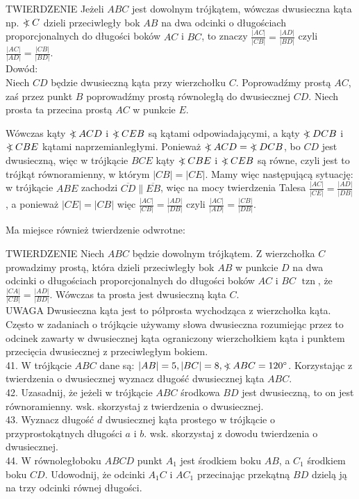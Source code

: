 \documentclass[10pt]{article}
\newcommand\Varangle{\mathop{{<\!\!\!\!\!\text{\small)}}\:}\nolimits}
\begin{document}
TWIERDZENIE Jeżeli \(A B C\) jest dowolnym trójkątem, wówczas dwusieczna kąta np. \(\Varangle C\) dzieli przeciwległy bok \(A B\) na dwa odcinki o długościach proporcjonalnych do długości boków \(A C\) i \(B C\), to znaczy \(\frac{|A C|}{|C B|}=\frac{|A D|}{|B D|}\) czyli \(\frac{|A C|}{|A D|}=\frac{|C B|}{|B D|}\).\\
Dowód:\\
Niech \(C D\) będzie dwusieczną kąta przy wierzchołku \(C\). Poprowadźmy prostą \(A C\), zaś przez punkt \(B\) poprowadźmy prostą równoległą do dwusiecznej \(C D\). Niech prosta ta przecina prostą \(A C\) w punkcie \(E\).

Wówczas kąty \(\Varangle A C D\) i \(\Varangle C E B\) są kątami odpowiadającymi, a kąty \(\Varangle D C B\) i \(\Varangle C B E\) kątami naprzemianległymi. Ponieważ \(\Varangle A C D=\Varangle D C B\), bo \(C D\) jest dwusieczną, więc w trójkącie \(B C E\) kąty \(\Varangle C B E\) i \(\Varangle C E B\) są równe, czyli jest to trójkąt równoramienny, w którym \(|C B|=|C E|\). Mamy więc następującą sytuację: w trójkącie \(A B E\) zachodzi \(\overline{C D} \| \overline{E B}\), więc na mocy twierdzenia Talesa \(\frac{|A C|}{|C E|}=\frac{|A D|}{|D B|}\), a ponieważ \(|C E|=|C B|\) więc \(\frac{|A C|}{|C B|}=\frac{|A D|}{|D B|}\) czyli \(\frac{|A C|}{|A D|}=\frac{|C B|}{|D B|}\).

Ma miejsce również twierdzenie odwrotne:

TWIERDZENIE Niech \(A B C\) będzie dowolnym trójkątem. Z wierzchołka \(C\) prowadzimy prostą, która dzieli przeciwległy bok \(A B\) w punkcie \(D\) na dwa odcinki o długościach proporcjonalnych do długości boków \(A C\) i \(B C\) \(\operatorname{tzn}\), że \(\frac{|C A|}{|C B|}=\frac{|A D|}{|B D|}\). Wówczas ta prosta jest dwusieczną kąta \(C\).\\
UWAGA Dwusieczna kąta jest to półprosta wychodząca z wierzchołka kąta. Często w zadaniach o trójkącie używamy słowa dwusieczna rozumiejąc przez to odcinek zawarty w dwusiecznej kąta ograniczony wierzchołkiem kąta i punktem przecięcia dwusiecznej z przeciwległym bokiem.\\
41. W trójkącie \(A B C\) dane są: \(|A B|=5,|B C|=8, \Varangle A B C=120^{\circ}\). Korzystając z twierdzenia o dwusiecznej wyznacz długość dwusiecznej kąta \(A B C\).\\
42. Uzasadnij, że jeżeli w trójkącie \(A B C\) środkowa \(B D\) jest dwusieczną, to on jest równoramienny. wsk. skorzystaj z twierdzenia o dwusiecznej.\\
43. Wyznacz długość \(d\) dwusiecznej kąta prostego w trójkącie o przyprostokątnych długości \(a\) i \(b\). wsk. skorzystaj z dowodu twierdzenia o dwusiecznej.\\
44. W równoległoboku \(A B C D\) punkt \(A_{1}\) jest środkiem boku \(A B\), a \(C_{1}\) środkiem boku \(C D\). Udowodnij, że odcinki \(A_{1} C\) i \(A C_{1}\) przecinając przekątną \(B D\) dzielą ją na trzy odcinki równej długości.
\end{document}
